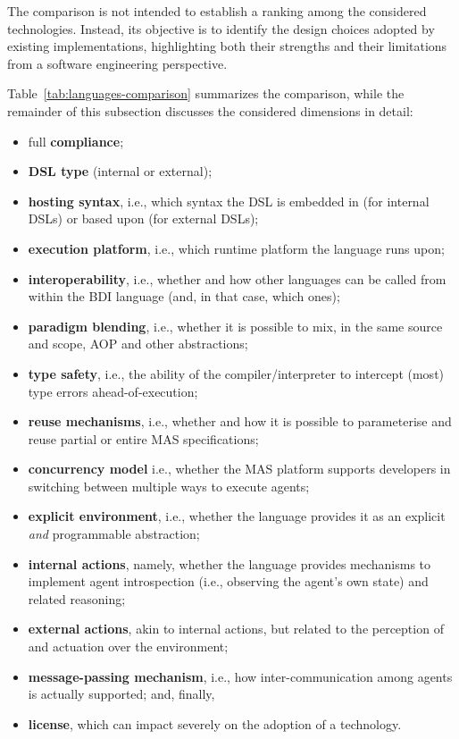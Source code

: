 The comparison is not intended to establish a ranking among the considered technologies. 
%
Instead, its objective is to identify the design choices adopted by existing \agentspeak{} implementations, 
highlighting both their strengths and their limitations from a software engineering perspective. 
%

Table~\ref{tab:languages-comparison} summarizes the comparison, 
while the remainder of this subsection discusses the considered dimensions in detail:
\begin{itemize}
    \item full \textbf{\agentspeak{} compliance};
    \item \textbf{\ac{DSL} type} (internal or external);
    \item \textbf{hosting syntax}, i.e., which syntax the \ac{DSL} is embedded in (for internal \acp{DSL}) or based upon (for external \acp{DSL});
    \item \textbf{execution platform}, i.e., which runtime platform the language runs upon;
    \item \textbf{interoperability}, i.e., whether and how other languages can be called from within the \ac{BDI} language (and, in that case, which ones);
    \item \textbf{paradigm blending}, i.e., whether it is possible to mix, in the same source and scope, AOP and other abstractions;
    \item \textbf{type safety}, i.e., the ability of the compiler/interpreter to intercept (most) type errors ahead-of-execution;
    \item \textbf{reuse mechanisms}, i.e., whether and how it is possible to parameterise and reuse partial or entire \ac{MAS} specifications;
    \item \textbf{concurrency model} i.e., whether the \ac{MAS} platform supports developers in switching between multiple ways to execute agents;
    \item \textbf{explicit environment}, i.e., whether the language provides it as an explicit \emph{and} programmable abstraction;
    \item \textbf{internal actions}, namely, whether the language provides mechanisms to implement agent introspection
          (i.e., observing the agent's own state) and related reasoning;
    \item \textbf{external actions}, akin to internal actions, but related to the perception of and actuation over the environment;
    \item \textbf{message-passing mechanism}, i.e., how inter-communication among agents is actually supported;
    and, finally,
    \item \textbf{license}, which can impact severely on the adoption of a technology.
\end{itemize}

